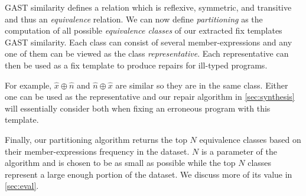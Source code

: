 GAST similarity defines a relation which is reflexive, symmetric, and transitive
and thus an \emph{equivalence} relation. We can now define \emph{partitioning}
as the computation of all possible \emph{equivalence classes} of our extracted
fix templates \wrt GAST similarity. Each class can consist of several
member-expressions and any one of them can be viewed as the class
\emph{representative}. Each representative can then be used as a fix template to
produce repairs for ill-typed programs.

For example, $\hat{x} \oplus \hat{n}$ and $\hat{n} \oplus \hat{x}$ are similar
so they are in the same class. Either one can be used as the representative and
our repair algorithm in \autoref{sec:synthesis} will essentially consider both
when fixing an erroneous program with this template.

Finally, our partitioning algorithm returns the top $N$ equivalence classes
based on their member-expressions frequency in the dataset. $N$ is a parameter
of the algorithm and is chosen to be as small as possible while the top $N$
classes represent a large enough portion of the dataset. We discuss more of its
value in \autoref{sec:eval}.
